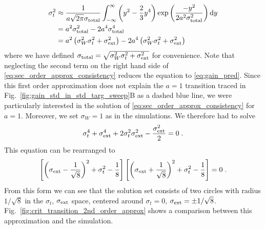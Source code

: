 \documentclass[10pt,a4paper]{article}
\begin{document}
\begin{align}
\sigma_{t}^2 &\approx \frac{1}{a\sqrt{2 \pi}\sigma_{\rm total}}\int_{-\infty}^{\infty}\left( y^2 - \frac{2}{3}y^4\right)\exp\left( \frac{-y^2}{2a^2\sigma_{\rm total}^2}\right) \mathrm{d}y \\
&= a^2\sigma_{\rm total}^2 - 2a^4\sigma_{\rm total}^4 \\
&= a^2\left( \sigma^2_{W}\sigma^2_{t} + \sigma^2_{\rm ext} \right) - 2a^4 \left( \sigma^2_{W}\sigma^2_{t} + \sigma^2_{\rm ext} \right) \label{eq:sec_order_approx_consistency}
\end{align}
where we have defined $\sigma_{\rm total} = \sqrt{\sigma^2_{W}\sigma^2_{t} + \sigma^2_{\rm ext}}$ for convenience. Note that neglecting the second term on the right hand side of \eqref{eq:sec_order_approx_consistency} reduces the equation to \eqref{eq:gain_pred}. Since this first order approximation does not explain the $a=1$ transition traced in Fig.~\ref{fig:gain_std_in_std_targ_sweep}B as a dashed blue line, we were particularly interested in the solution of \eqref{eq:sec_order_approx_consistency} for $a=1$. Moreover, we set $\sigma_{W}=1$ as in the simulations. We therefore had to solve
\begin{equation}
	\sigma_{t}^4 + \sigma_{\rm ext}^4 + 2\sigma_{t}^2\sigma_{\rm ext}^2 - \frac{\sigma_{\rm ext}^2}{2} = 0 \; .
\end{equation}
This equation can be rearranged to
\begin{equation}
	\left[\left(\sigma_{\rm ext} - \frac{1}{\sqrt{8}}\right)^2 + \sigma_{t}^2 - \frac{1}{8}\right]\left[\left(\sigma_{\rm ext} + \frac{1}{\sqrt{8}}\right)^2 + \sigma_{t}^2 - \frac{1}{8}\right] = 0 \; . \label{eq:circles_solution_form}
\end{equation}
From this form we can see that the solution set consists of two circles with radius $1/\sqrt{8}$ in the $\sigma_{t}$, $\sigma_{\rm ext}$ space, centered around $\sigma_{t} = 0$, $\sigma_{\rm ext} = \pm 1/\sqrt{8}$. Fig.~\ref{fig:crit_transition_2nd_order_approx} shows a comparison between this approximation and the simulation.
\end{document}
